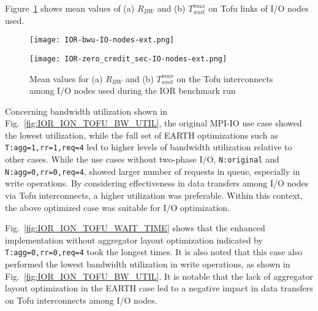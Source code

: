 \documentclass{jhps}
\begin{document}
Figure~\ref{fig:IOR_ION_TOFU_BWU_WAIT_TIME} shows mean values of
(a) $R_{BW}$ and (b) $T_{wait}^{max}$ on Tofu links of I/O nodes used.
%
\begin{figure}[tb]
\centering
\begin{minipage}[t]{0.48\textwidth}
 \centering
 \texttt{[image: IOR-bwu-IO-nodes-ext.png]}
 \label{fig:IOR_ION_TOFU_BW_UTIL}
\end{minipage}
%
\noindent
\begin{minipage}[t]{0.48\textwidth}
 \centering
 \texttt{[image: IOR-zero\_credit\_sec-IO-nodes-ext.png]}
 \label{fig:IOR_ION_TOFU_WAIT_TIME}
\end{minipage}
\caption{
Mean values for (a) $R_{BW}$ and (b) $T_{wait}^{max}$ on the Tofu interconnects
among I/O nodes used during the IOR benchmark run}
\label{fig:IOR_ION_TOFU_BWU_WAIT_TIME}
\end{figure}
%
Concerning bandwidth utilization shown in
Fig.~\ref{fig:IOR_ION_TOFU_BW_UTIL},
the original MPI-IO use case showed the lowest utilization,
while the full set of EARTH optimizations such as {\tt T:agg=1,rr=1,req=4}
led to higher levels of bandwidth utilization relative to other cases.
While the use cases without two-phase I/O,
{\tt N:original} and {\tt N:agg=0,rr=0,req=4}, showed
larger number of requests in queue, especially in write operations.
By considering effectiveness in data transfers among I/O nodes via Tofu interconnects,
a higher utilization was preferable.
Within this context, the above optimized case was suitable for I/O optimization.

Fig.~\ref{fig:IOR_ION_TOFU_WAIT_TIME}
shows that the enhanced implementation
without aggregator layout optimization indicated by {\tt T:agg=0,rr=0,req=4}
took the longest times.
It is also noted that this case also performed the lowest bandwidth utilization
in write operations,
as shown in Fig.~\ref{fig:IOR_ION_TOFU_BW_UTIL}.
It is notable that the lack of aggregator layout optimization in the EARTH case
led to a negative impact in data transfers on Tofu interconnects among I/O nodes.
\end{document}
